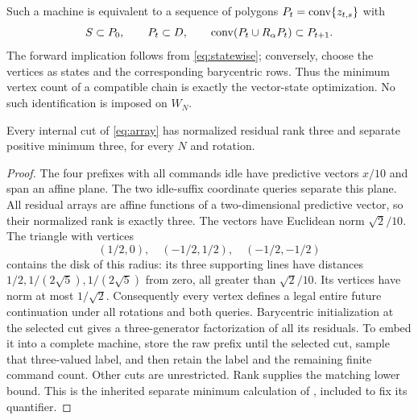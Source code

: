 Such a machine is equivalent to a sequence of polygons
$P_t=\operatorname{conv}\{z_{t,s}\}$ with
\begin{equation}\label{eq:chain}
 S\subset P_0,\qquad P_t\subset D,\qquad
                 \operatorname{conv}(P_t\cup R_\alpha P_t)\subset P_{t+1}.
\end{equation}
The forward implication follows from \eqref{eq:statewise}; conversely,
choose the vertices as states and the corresponding barycentric rows.
Thus the minimum vertex count of a compatible chain is exactly the
vector-state optimization. No such identification is imposed on $W_N$.

\begin{proposition}\label{prop:separate}
Every internal cut of \eqref{eq:array} has normalized residual rank
three and separate positive minimum three, for every $N$ and rotation.
\end{proposition}
\begin{proof}
The four prefixes with all commands idle have predictive vectors $x/10$
and span an affine plane. The two idle-suffix coordinate queries separate
this plane. All residual arrays are affine functions of a two-dimensional
predictive vector, so their normalized rank is exactly three.
The vectors have Euclidean norm $\sqrt2/10$. The triangle with vertices
\[
             (1/2,0),\quad(-1/2,1/2),\quad(-1/2,-1/2)
\]
contains the disk of this radius: its three supporting lines have
distances $1/2,1/(2\sqrt5),1/(2\sqrt5)$ from zero, all greater than
$\sqrt2/10$. Its vertices have norm at most $1/\sqrt2$.
Consequently every vertex defines a legal entire future continuation
under all rotations and both queries. Barycentric initialization at the
selected cut gives a three-generator factorization of all its residuals.
To embed it into a complete machine, store the raw prefix until the
selected cut, sample that three-valued label, and then retain the label
and the remaining finite command count. Other cuts are unrestricted.
Rank supplies the matching lower bound. This is the inherited separate
minimum calculation of \cite{GTF32}, included to fix its quantifier.
\end{proof}

